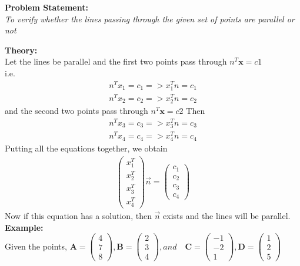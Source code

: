 \documentclass[a4paper,12pt]{article}
\newcommand{\myvec}[1]{\ensuremath{\begin{pmatrix}#1\end{pmatrix}}}
\begin{document}
\begin{flushleft}	
\textbf{Problem Statement:} \\
\textit{To verify whether the lines passing through the given set of points are parallel or not} \vspace{5mm}

\textbf{Theory:} \\
Let the lines be parallel and the first two points pass through $n^T\textbf{x} = c1$\\
i.e.
\begin{align}
n^Tx_1=c_1 => x_1^Tn = c_1 \\
n^Tx_2=c_2 => x_2^Tn = c_2
\end{align}
and the second two points pass through $n^T\textbf{x} = c2$
Then
\begin{align}
n^Tx_3=c_3 => x_3^Tn = c_3 \\
n^Tx_4=c_4 => x_4^Tn = c_4
\end{align}
Putting all the equations together, we obtain
\begin{align}
\myvec{x_1^T\\x_2^T\\x_3^T\\x_4^T}\vec{n} = \myvec{c_1\\c_2\\c_3\\c_4}
\end{align}
Now if this equation has a solution, then $\vec{n}$ exists and the lines will be parallel.\\
\vspace{3mm}
\textbf{Example:}\\
Given the points, $\textbf{A} = \begin{pmatrix} 4\\	7\\	8\end{pmatrix}, 
\textbf{B} = \begin{pmatrix} 2\\ 3\\ 4 \end{pmatrix}, and \quad
\textbf{C} = \begin{pmatrix} -1\\ -2\\ 1 \end{pmatrix}, 
\textbf{D} = \begin{pmatrix} 1\\ 2\\ 5 \end{pmatrix} $\\


\end{flushleft}
\end{document}
